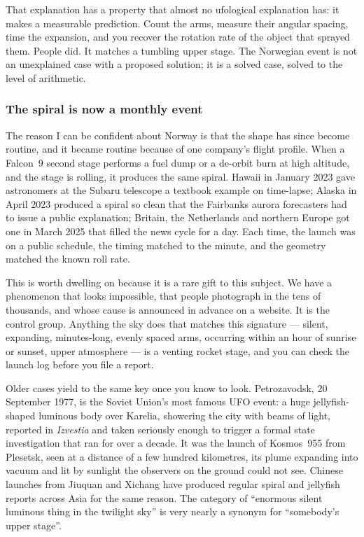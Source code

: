 That explanation has a property that almost no ufological explanation has: it makes a measurable
prediction. Count the arms, measure their angular spacing, time the expansion, and you recover the
rotation rate of the object that sprayed them. People did. It matches a tumbling upper stage.
The Norwegian event is not an unexplained case with a proposed solution; it is a solved case,
solved to the level of arithmetic.

\subsubsection*{The spiral is now a monthly event}

The reason I can be confident about Norway is that the shape has since become routine, and it
became routine because of one company's flight profile. When a Falcon~9 second stage performs a
fuel dump or a de-orbit burn at high altitude, and the stage is rolling, it produces the same
spiral. Hawaii in January 2023 gave astronomers at the Subaru telescope a textbook example on
time-lapse; Alaska in April 2023 produced a spiral so clean that the Fairbanks aurora forecasters
had to issue a public explanation; Britain, the Netherlands and northern Europe got one in March
2025 that filled the news cycle for a day. Each time, the launch was on a public schedule, the
timing matched to the minute, and the geometry matched the known roll rate.

This is worth dwelling on because it is a rare gift to this subject. We have a phenomenon that
looks impossible, that people photograph in the tens of thousands, and whose cause is announced
in advance on a website. It is the control group. Anything the sky does that matches this
signature --- silent, expanding, minutes-long, evenly spaced arms, occurring within an hour of
sunrise or sunset, upper atmosphere --- is a venting rocket stage, and you can check the launch
log before you file a report.

Older cases yield to the same key once you know to look. Petrozavodsk, 20 September 1977, is the
Soviet Union's most famous UFO event: a huge jellyfish-shaped luminous body over Karelia, showering
the city with beams of light, reported in \emph{Izvestia} and taken seriously enough to trigger a
formal state investigation that ran for over a decade. It was the launch of Kosmos~955 from
Plesetsk, seen at a distance of a few hundred kilometres, its plume expanding into vacuum and lit
by sunlight the observers on the ground could not see. Chinese launches from Jiuquan and Xichang
have produced regular spiral and jellyfish reports across Asia for the same reason. The category
of ``enormous silent luminous thing in the twilight sky'' is very nearly a synonym for
``somebody's upper stage''.

